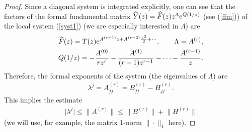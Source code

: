 \begin{proof}
Since a diagonal system is integrated explicitly, one can see that the factors of the formal fundamental matrix
$\widehat Y(z)=\widehat F(z) z^{\Lambda}{\rm e}^{Q(1/z)}$ (see (\ref{ffm})) of the local system (\ref{syst1}) (we are
especially interested in $\Lambda$) are
\begin{gather*}
\widehat F(z)=T(z){\rm e}^{A^{(r+1)}z+A^{(r+2)}\frac{z^2}2+\cdots}, \qquad \Lambda=A^{(r)},\\
Q(1/z)=-\frac{A^{(0)}}{rz^r}-\frac{A^{(1)}}{(r-1)z^{r-1}}-\cdots-\frac{A^{(r-1)}}z.
\end{gather*}
Therefore, the formal exponents of the system (the eigenvalues of $\Lambda$) are
\begin{gather*}
\lambda^j=A^{(r)}_{jj}=B^{(r)}_{jj}-H^{(r)}_{jj}.
\end{gather*}
This implies the estimate
\begin{gather*}
\big|\lambda^j\big|\leqslant\big\|A^{(r)}\big\|\leqslant\big\|B^{(r)}\big\|+\big\|H^{(r)}\big\|
\end{gather*}
(we will use, for example, the matrix 1-norm $\|\cdot\|_1$ here).


\end{proof}
